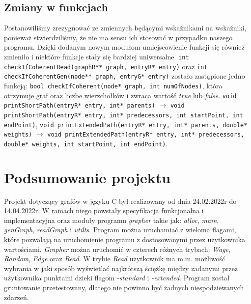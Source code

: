 \documentclass[10pt, a4paper]{report}
\begin{document}
    \subsection{Zmiany w funkcjach}
    Postanowiliśmy zrezygnować ze zmiennych będącymi wskaźnikami na wskaźniki, ponieważ stwierdziliśmy, że nie ma sensu ich stosować w przypadku naszego programu.
    Dzięki dodanym nowym modułom umiejscowienie funkcji się również zmieniło i niektóre funkcje stały się bardziej uniwersalne.
    \newline \texttt{int checkIfCoherentRead(graphR** graph, entryR* entry)} oraz \newline \texttt{int checkIfCoherentGen(node** graph, entryG* entry)} zostało zastąpione jedno funkcją:
    \newline\newline \texttt{bool checkIfCoherent(node* graph, int numOfNodes)}, która otrzymuje graf oraz liczbe wierzchołków i zwraca wartość \textit{true} lub \textit{false}.
    \newline\newline \texttt{void printShortPath(entryR* entry, int* parents)} $\rightarrow$ \newline\texttt{void printShortPath(entryR* entry, int* predecessors, int startPoint, int endPoint)},
    \newline\newline \texttt{void printExtendedPath(entryR* entry, int* parents, double* weights)} $\rightarrow$ \newline \texttt{void printExtendedPath(entryR* entry, int* predecessors, double* weights, int startPoint, int endPoint)}.
    
    \section{Podsumowanie projektu}
    Projekt dotyczący grafów w języku C był realizowany od dnia 24.02.2022r do 14.04.2022r. W ramach niego powstały specyfikacja funkcjonalna i implementacyjna oraz moduły programu
    \textit{grapher} takie jak: \textit{alloc}, \textit{main}, \textit{genGraph}, \textit{readGraph} i \textit{utilts}. Program można uruchamiać z wieloma flagami, które pozwalają na uruchomienie programu
    z dostosowanymi przez użytkownika wartościami. \textit{Grapher} można uruchomić w czterech różnych trybach: \textit{Wage}, \textit{Random}, \textit{Edge} oraz \textit{Read}.
    W trybie \textit{Read} użytkownik ma m.in. możliwość wybrania w jaki sposób wyświetlać najkrótszą ściężkę między zadanymi przez użytkownika punktami dzieki flagom
    \textit{-standard} i \textit{-extended}. Program został gruntowanie przetestowany, dlatego nie powinno być żadnych niespodziewanych zdarzeń.
\end{document}
